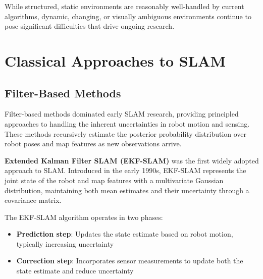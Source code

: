\documentclass[12pt]{article}
\begin{document}
    While structured, static environments are reasonably well-handled by current algorithms, dynamic, changing, or visually ambiguous environments continue to pose significant difficulties that drive ongoing research.

    \section{Classical Approaches to SLAM}

    \subsection{Filter-Based Methods}
    
    Filter-based methods dominated early SLAM research, providing principled approaches to handling the inherent uncertainties in robot motion and sensing. These methods recursively estimate the posterior probability distribution over 
    robot poses and map features as new observations arrive.
    
    \textbf{Extended Kalman Filter SLAM (EKF-SLAM)} was the first widely adopted approach to SLAM. Introduced in the early 1990s, EKF-SLAM represents the joint state of the robot and map features with a multivariate Gaussian distribution, 
    maintaining both mean estimates and their uncertainty through a covariance matrix.
    
    The EKF-SLAM algorithm operates in two phases:
    \begin{itemize}
        \item \textbf{Prediction step}: Updates the state estimate based on robot motion, typically increasing uncertainty
        \item \textbf{Correction step}: Incorporates sensor measurements to update both the state estimate and reduce uncertainty
    \end{itemize}
\end{document}
